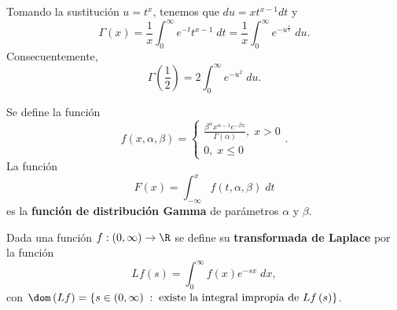 \begin{eg}
\normalfont Tomando la sustitución $\displaystyle u = t ^{x} $, tenemos que $\displaystyle du = xt ^{x-1}dt $ y
\[\Gamma\left(x\right) = \frac{1}{x}\int^{\infty}_{0} e^{-t}t ^{x-1} \; dt = \frac{1}{x}\int^{\infty}_{0} e^{-u^{\frac{1}{x}}} \; du .\]
Consecuentemente,
\[\Gamma\left(\frac{1}{2}\right) = 2\int^{\infty}_{0} e^{-u^{2}} \; du .\]
\end{eg}
\begin{fdefinition}
\normalfont Se define la función 
\[f\left(x, \alpha, \beta\right) =
\begin{cases}
\frac{\beta ^{\alpha }x^{\alpha - 1}e^{-\beta x}}{\Gamma\left(\alpha \right)}, \; x > 0 \\
0, \; x \leq 0
\end{cases}
.\]
La función 
\[ F\left(x\right) = \int^{x}_{-\infty} f\left(t,\alpha,\beta \right) \; dt \]
es la \textbf{función de distribución Gamma} de parámetros $\displaystyle \alpha  $ y $\displaystyle \beta  $.
\end{fdefinition}
\begin{fdefinition}
\normalfont Dada una función $\displaystyle f : \left(0,\infty\right) \to \R $ se define su \textbf{transformada de Laplace} por la función
\[Lf\left(s\right) = \int^{\infty}_{0} f\left(x\right)e^{-sx} \; dx,\]
con $\displaystyle \dom\left(Lf\right) = \left\{ s \in \left(0,\infty\right) \; : \; \text{existe la integral impropia de }Lf\left(s\right)\right\}  $.
\end{fdefinition}
